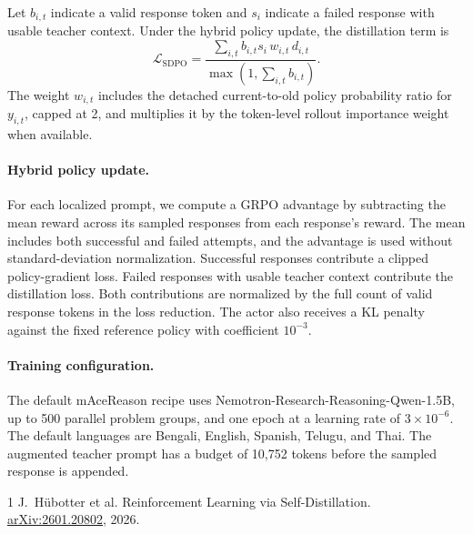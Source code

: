 \documentclass[11pt]{article}
\begin{document}
Let \(b_{i,t}\) indicate a valid response token and \(s_i\) indicate a
failed response with usable teacher context. Under the hybrid policy update,
the distillation term is
\begin{equation}
\mathcal L_{\mathrm{SDPO}} =
\frac{\sum_{i,t} b_{i,t}s_i\,w_{i,t}\,d_{i,t}}
     {\max(1,\sum_{i,t} b_{i,t})}.
\label{eq:sdpo-loss}
\end{equation}
The weight \(w_{i,t}\) includes the detached current-to-old policy
probability ratio for \(y_{i,t}\), capped at 2, and multiplies it by the
token-level rollout importance weight when available.

\paragraph{Hybrid policy update.}
For each localized prompt, we compute a GRPO advantage by subtracting the
mean reward across its sampled responses from each response's reward.
The mean includes both successful and failed attempts, and the advantage
is used without standard-deviation normalization. Successful responses
contribute a clipped policy-gradient loss. Failed responses with usable
teacher context contribute the distillation loss. Both contributions are
normalized by the full count of valid response tokens in the loss
reduction. The actor also receives a KL penalty against the fixed
reference policy with coefficient \(10^{-3}\).

\paragraph{Training configuration.}
The default mAceReason recipe uses Nemotron-Research-Reasoning-Qwen-1.5B,
up to 500 parallel problem groups, and one epoch at a learning rate of
\(3\times10^{-6}\). The default languages are Bengali, English, Spanish,
Telugu, and Thai. The augmented teacher prompt has a budget of 10,752
tokens before the sampled response is appended.

\begin{thebibliography}{1}
J.~H\"ubotter et al.
\newblock Reinforcement Learning via Self-Distillation.
\newblock \href{https://arxiv.org/abs/2601.20802}{arXiv:2601.20802}, 2026.
\end{thebibliography}
\end{document}
